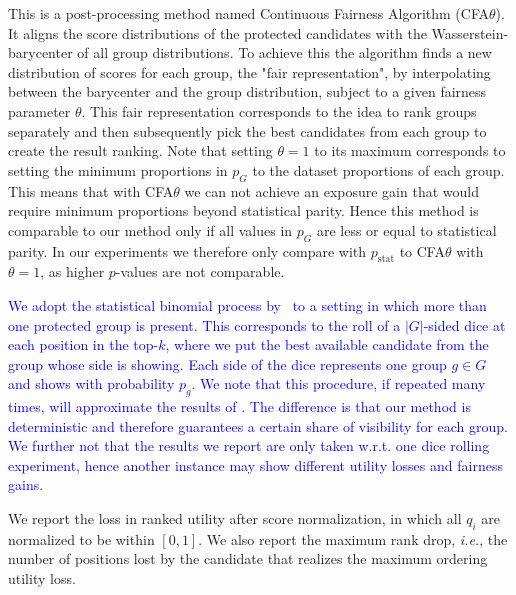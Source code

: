  This is a post-processing method named Continuous Fairness Algorithm (CFA$\theta$).
%
It aligns the score distributions of the protected candidates with the Wasserstein-barycenter of all group distributions.
%
To achieve this the algorithm finds a new distribution of scores for each group, the "fair representation", by interpolating between the barycenter and the group distribution, subject to a given fairness parameter $\theta$.
%
This fair representation corresponds to the idea to rank groups separately and then subsequently pick the best candidates from each group to create the result ranking.
%
Note that setting $\theta=1$ to its maximum corresponds to setting the minimum proportions in $p_G$ to the dataset proportions of each group.
%
This means that with CFA$\theta$ we can not achieve an exposure gain that would require minimum proportions beyond statistical parity.
%
Hence this method is comparable to our method only if all values in $p_G$ are less or equal to statistical parity.
%
In our experiments we therefore only compare \algoFAIR with $p_{\text{stat}}$ to CFA$\theta$ with $\theta=1$, as higher $p$-values are not comparable.

\textcolor{blue}{ We adopt the statistical binomial process by~\cite{yang2016measuring} to a setting in which more than one protected group is present. 
	This corresponds to the roll of a $|G|$-sided dice at each position in the top-$k$, where we put the best available candidate from the group whose side is showing.
	Each side of the dice represents one group $g \in G$ and shows with probability $p_g$.
	We note that this procedure, if repeated many times, will approximate the results of \algoFAIR. 
	The difference is that our method is deterministic and therefore guarantees a certain share of visibility for each group.
%
We further not that the results we report are only taken w.r.t. one dice rolling experiment, hence another instance may show different utility losses and fairness gains.
}

 We report the loss in ranked utility after score normalization, in which all $q_i$ are normalized to be within $[0, 1]$.
%
We also report the maximum rank drop, {\em i.e.}, the number of positions lost by the candidate that realizes the maximum ordering utility loss.


